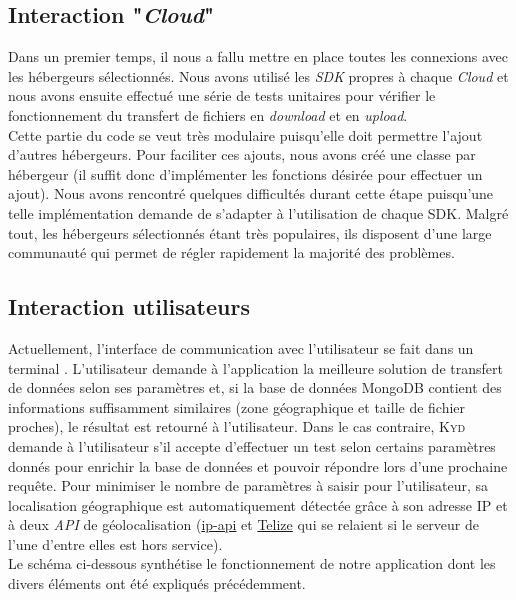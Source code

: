 \documentclass[10pt]{article}
\newcommand{\KYD}{\textsc{Kyd}\xspace}
\begin{document}
\subsection{Interaction "\textit{Cloud}"}

Dans un premier temps, il nous a fallu mettre en place toutes les
connexions avec les hébergeurs sélectionnés. Nous avons utilisé les
\textit{SDK} propres à chaque \textit{Cloud} et nous avons ensuite effectué une série
de tests unitaires pour vérifier le fonctionnement du transfert de
fichiers en \textit{download} et en \textit{upload}.\\

Cette partie du code se veut très modulaire puisqu'elle doit permettre l'ajout
d'autres hébergeurs. Pour faciliter ces ajouts, nous avons créé une classe par
hébergeur (il suffit donc d'implémenter les fonctions désirée pour effectuer un
ajout). Nous avons rencontré quelques difficultés durant cette étape puisqu'une
telle implémentation demande de s'adapter à l'utilisation de chaque SDK. Malgré
tout, les hébergeurs sélectionnés étant très populaires, ils disposent d'une
large communauté qui permet de régler rapidement la majorité des problèmes.

\subsection{Interaction utilisateurs}

Actuellement, l'interface de communication avec l'utilisateur se fait
dans un terminal \Unix. L'utilisateur demande à l'application la meilleure
solution de transfert de données selon ses paramètres et, si la base
de données MongoDB contient des informations suffisamment similaires (zone géographique et taille de fichier proches),
le résultat est retourné à l'utilisateur. Dans le cas contraire, \KYD
demande à l'utilisateur s'il accepte d'effectuer un test selon
certains paramètres donnés pour enrichir la base de données et pouvoir
répondre lors d'une prochaine requête. Pour minimiser le nombre de
paramètres à saisir pour l'utilisateur, sa localisation géographique
est automatiquement détectée grâce à son adresse IP et à deux \textit{API} de
géolocalisation (\href{http://ip-api.com/docs/api:json}{ip-api} et
\href{http://www.telize.com/}{Telize} qui se relaient si le serveur de l'une
d'entre elles est hors service).\\

Le schéma ci-dessous synthétise le fonctionnement de notre application
dont les divers éléments ont été expliqués précédemment.
\end{document}
